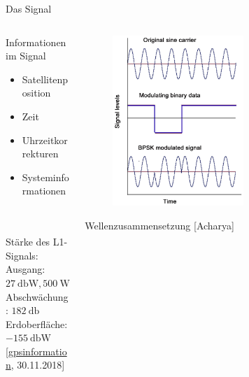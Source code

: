 \begin{frame}{Das Signal}
    \begin{columns}
        \begin{column}{0.5\textwidth}
            Informationen im Signal
            \begin{itemize}
                \item Satellitenposition
                \item Zeit
                \item Uhrzeitkorrekturen
                \item Systeminformationen
                \end{itemize}
                ~\\~\\
                Stärke des L1-Signals: \\
                Ausgang: $\SI{27}{\decibel\watt}, \SI{500}{\watt}$ \\
                Abschwächung: $\SI{182}{\decibel}$ \\
                Erdoberfläche: $\SI{-155}{\decibel\watt}$ \\
                {\small [\href{www.gpsinformation.net/main/gpspower.htm}{gpsinformation}, 30.11.2018]}
        \end{column}
        \begin{column}{0.5\textwidth}
            \begin{figure}
                \centering
                \includegraphics[width=0.6\textwidth]{images/signalzusammensetzung.png}
            \end{figure}
            Wellenzusammensetzung {\small[Acharya]}
        \end{column}
    \end{columns}
\end{frame}
